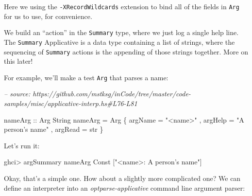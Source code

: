 \documentclass[]{article}
\newenvironment{Shaded}{}{}
\newcommand{\CommentTok}[1]{\textcolor[rgb]{0.38,0.63,0.69}{\textit{#1}}}
\newcommand{\DataTypeTok}[1]{\textcolor[rgb]{0.56,0.13,0.00}{#1}}
\newcommand{\NormalTok}[1]{#1}
\newcommand{\OperatorTok}[1]{\textcolor[rgb]{0.40,0.40,0.40}{#1}}
\newcommand{\OtherTok}[1]{\textcolor[rgb]{0.00,0.44,0.13}{#1}}
\newcommand{\StringTok}[1]{\textcolor[rgb]{0.25,0.44,0.63}{#1}}
\begin{document}
Here we using the \texttt{-XRecordWildcards} extension to bind all of the fields
in \texttt{Arg} for us to use, for convenience.

We build an ``action'' in the \texttt{Summary} type, where we just log a single
help line. The \texttt{Summary} Applicative is a data type containing a list of
strings, where the sequencing of \texttt{Summary} actions is the appending of
those strings together. More on this later!

For example, we'll make a test \texttt{Arg} that parses a name:

\begin{Shaded}
\begin{Highlighting}[]
\CommentTok{-- source: https://github.com/mstksg/inCode/tree/master/code-samples/misc/applicative-interp.hs#L76-L81}

\OtherTok{nameArg ::} \DataTypeTok{Arg} \DataTypeTok{String}
\NormalTok{nameArg }\OtherTok{=} \DataTypeTok{Arg}
\NormalTok{    \{ argName }\OtherTok{=} \StringTok{"<name>"}
\NormalTok{    , argHelp }\OtherTok{=} \StringTok{"A person's name"}
\NormalTok{    , argRead }\OtherTok{=}\NormalTok{ str}
\NormalTok{    \}}
\end{Highlighting}
\end{Shaded}

Let's run it:

\begin{Shaded}
\begin{Highlighting}[]
\NormalTok{ghci}\OperatorTok{>}\NormalTok{ argSummary nameArg}
\DataTypeTok{Const}\NormalTok{ [}\StringTok{"<name>: A person's name"}\NormalTok{]}
\end{Highlighting}
\end{Shaded}

Okay, that's a simple one. How about a slightly more complicated one? We can
define an interpreter into an \emph{optparse-applicative} command line argument
parser:

\begin{Shaded}
\end{Shaded}
\end{document}
